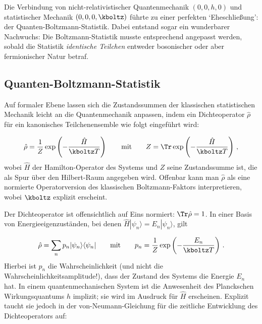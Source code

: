 
\newpage {}
\label{sec:0011}

Die Verbindung von nicht-relativistischer Quantenmechanik $(0,0,h,0)$ und statistischer Mechanik $(0,0,0,\kboltz)$ führte zu einer perfekten \enquote*{Eheschließung}: der Quanten-Boltzmann-Statistik. Dabei entstand sogar ein wunderbarer Nachwuchs: Die Boltzmann-Statistik musste entsprechend angepasst werden, sobald die Statistik \emph{identische Teilchen} entweder bosonischer oder aber fermionischer Natur betraf.


\subsection*{Quanten-Boltzmann-Statistik}

Auf formaler Ebene lassen sich die Zustandssummen der klassischen statistischen Mechanik leicht an die Quantenmechanik anpassen, indem ein Dichteoperator $\hat\rho$ für ein kanonisches Teilchenensemble wie folgt eingeführt wird:

\begin{equation*}
  \hat \rho=\frac{1}{Z} \exp\left(-\frac{\hat H}{\kboltz T}\right)
    \qquad \textrm{mit} \qquad
    Z=\Tr \exp\left(-\frac{\hat H}{\kboltz T}\right)\,,
\end{equation*}
%
wobei $\hat H$ der Hamilton-Operator des Systems und $Z$ seine Zustandssumme ist, die als Spur über den Hilbert-Raum angegeben wird. Offenbar kann man $\hat\rho$ als eine normierte Operatorversion des klassischen Boltzmann-Faktors interpretieren, wobei $\kboltz$ explizit erscheint.

Der Dichteoperator ist offensichtlich auf Eins normiert: $\Tr \hat \rho=1$. In einer Basis von Energieeigenzuständen, bei denen $\hat H |\psi_n\rangle=E_n |\psi_n\rangle$, gilt

\begin{equation*}
  \hat \rho=\sum_n p_n |\psi_n\rangle \langle \psi_n|
    \qquad \textrm{mit} \qquad
    p_n=\frac{1}{Z} \exp\left(-\frac{E_n}{\kboltz T}\right)\,.
\end{equation*}
%
Hierbei ist $p_n$ die Wahrscheinlichkeit (und nicht die Wahrscheinlichkeitsamplitude!), dass der Zustand des Systems die Energie $E_n$ hat. In einem quantenmechanischen System ist die Anwesenheit des Planckschen Wirkungsquantums $h$ implizit; sie wird im Ausdruck für $\hat H$ erscheinen. Explizit taucht sie jedoch in der {von-Neumann-Gleichung} für die zeitliche Entwicklung des Dichteoperators auf:

